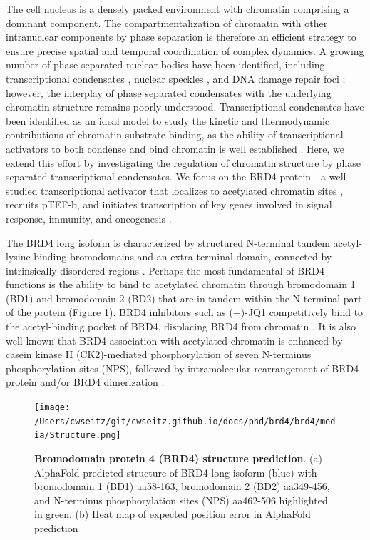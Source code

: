 The cell nucleus is a densely packed environment with chromatin comprising a dominant component. The compartmentalization of chromatin with other intranuclear components by phase separation is therefore an efficient strategy to ensure precise spatial and temporal coordination of complex dynamics. A growing number of phase separated nuclear bodies have been identified, including transcriptional condensates \parencite{Sabari2018,Hnisz2017}, nuclear speckles \parencite{Brown2008}, and DNA damage repair foci \parencite{Wang2023}; however, the interplay of phase separated condensates with the underlying chromatin structure remains poorly understood. Transcriptional condensates have been identified as an ideal model to study the kinetic and thermodynamic contributions of chromatin substrate binding, as the ability of transcriptional activators to both condense and bind chromatin is well established \parencite{Sabari2018,Wagh2021,Plys2018,Strom2024,Ma2021}. Here, we extend this effort by investigating the regulation of chromatin structure by phase separated transcriptional condensates. We focus on the BRD4 protein - a well-studied transcriptional activator that localizes to acetylated chromatin sites \parencite{Wu2018}, recruits pTEF-b, and initiates transcription of key genes involved in signal response, immunity, and oncogenesis \parencite{Itzen2014}.

The BRD4 long isoform is characterized by structured N-terminal tandem acetyl-lysine binding bromodomains and an extra-terminal domain, connected by intrinsically disordered regions \parencite{Han2020}. Perhaps the most fundamental of BRD4 functions is the ability to bind to acetylated chromatin through bromodomain 1 (BD1) and bromodomain 2 (BD2) that are in tandem within the N-terminal part of the protein (Figure \ref{fig:fig22}). BRD4 inhibitors such as (+)-JQ1 competitively bind to the acetyl-binding pocket of BRD4, displacing BRD4 from chromatin \parencite{Filippakopoulos2010}. It is also well known that BRD4 association with acetylated chromatin is enhanced by casein kinase II (CK2)-mediated phosphorylation of seven N-terminus phosphorylation sites (NPS), followed by intramolecular rearrangement of BRD4 protein and/or BRD4 dimerization \parencite{Wu2013,Malvezzi2021}.

\begin{figure}[t]
\centering
\texttt{[image: /Users/cwseitz/git/cwseitz.github.io/docs/phd/brd4/brd4/media/Structure.png]}
\caption{\textbf{Bromodomain protein 4 (BRD4) structure prediction}. (a) AlphaFold predicted structure of BRD4 long isoform (blue) with bromodomain 1 (BD1) aa58-163, bromodomain 2 (BD2) aa349-456, and N-terminus phosphorylation sites (NPS) aa462-506 highlighted in green. (b) Heat map of expected position error in AlphaFold prediction}
\label{fig:fig22}
\end{figure}

